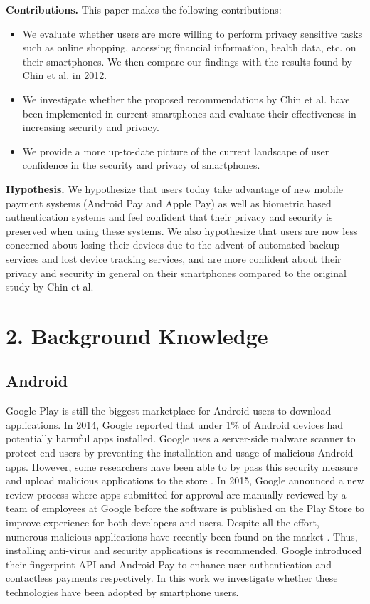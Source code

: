 \documentclass{sigchi}
\begin{document}
\textbf{Contributions.} This paper makes the following contributions:
\begin{itemize}
  \item We evaluate whether users are more willing to perform privacy sensitive tasks such as online shopping, accessing financial information, health data, etc. on their smartphones. We then compare our findings with the results found by Chin et al. in 2012.
  \item We investigate whether the proposed recommendations by Chin et al. have been implemented in current smartphones and evaluate their effectiveness in increasing security and privacy.
\item We provide a more up-to-date picture of the current landscape of user confidence in the security and privacy of smartphones.
\end{itemize}

\textbf{Hypothesis.} We hypothesize that users today take advantage of new mobile payment systems (Android Pay and Apple Pay) as well as biometric based authentication systems and feel confident that their privacy and security is preserved when using these systems. We also hypothesize that users are now less concerned about losing their devices due to the advent of automated backup services and lost device tracking services, and are more confident about their privacy and security in general on their smartphones compared to the original study by Chin et al.
\section{2. Background Knowledge}
\subsection{Android}
Google Play is still the biggest marketplace for Android users to download applications. In 2014, Google reported \cite{googlereport} that under 1\% of Android devices had potentially harmful apps installed. Google uses a server-side malware scanner to protect end users by preventing the installation and usage of malicious Android apps. However, some researchers have been able to by pass this security measure and upload malicious applications to the store \cite{googleshort}. In 2015, Google announced \cite{kim2015creating} a new review process where apps submitted for approval are manually reviewed by a team of employees at Google before the software is published on the Play Store to improve experience for both developers and users. Despite all the effort, numerous malicious applications have recently been found on the market \cite{goodin}. Thus, installing anti-virus and security applications is recommended. Google  introduced their fingerprint API and Android Pay to enhance user authentication and contactless payments respectively. In this work we investigate whether these technologies have been adopted by smartphone users.
\end{document}
